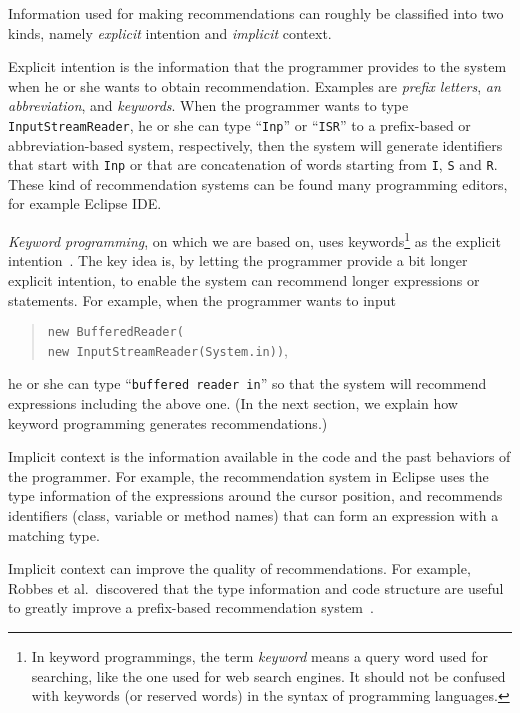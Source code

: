 \documentclass[PRO,english]{ipsj}
\begin{document}
Information used for making recommendations can roughly be classified into two kinds, namely \emph{explicit} intention and \emph{implicit} context.  

Explicit intention is the information that the programmer provides to the system when he or she wants to obtain recommendation.  Examples are \emph{prefix letters}, \emph{an abbreviation}, and \emph{keywords}.  When the programmer wants to type \texttt{InputStreamReader}, he or she can type ``\texttt{Inp}'' or ``\texttt{ISR}'' to a prefix-based or abbreviation-based system, respectively, then the system will generate identifiers that start with \texttt{Inp} or that are concatenation of words starting from \texttt{I}, \texttt{S} and \texttt{R}.  These kind of recommendation systems can be found many programming editors, for example Eclipse IDE.

\emph{Keyword programming}, on which we are based on,  uses keywords\footnote{In keyword programmings, the term \emph{keyword} means a query word used for searching, like the one used for web search engines.  It should not be confused with keywords (or reserved words) in the syntax of programming languages.} as the explicit intention~\cite{KeywordProgramming}.  The key idea is, by letting the programmer provide a bit longer explicit intention, to enable the system can recommend longer expressions or statements.  For example, when the programmer wants to input
\begin{quote}
  \texttt{new BufferedReader(\\
    \qquad{}new InputStreamReader(System.in))},   
\end{quote}
he or she can type ``\texttt{buffered reader in}'' so that the system will recommend expressions including the above one.  (In the next section, we explain how keyword programming generates recommendations.)

Implicit context is the information available in the code and the past behaviors of the programmer.  For example, the recommendation system in Eclipse uses the type information of the expressions around the cursor position, and recommends identifiers (class, variable or method  names) that can form an expression with a matching type.

Implicit context can improve the quality of recommendations.  For example, Robbes et al.\  discovered that the type information and code structure are useful to greatly improve a prefix-based recommendation system~\cite{ProgramHistory}.
\end{document}
